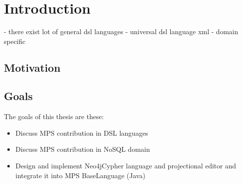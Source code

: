 \chapter{Introduction}

- there exist lot of general dsl languages
- universal dsl language xml
- domain specific

\section{Motivation}




\section{Goals}


The goals of this thesis are these:

\begin{itemize}
  \item Discuss MPS contribution in DSL languages
  \item Discuss MPS contribution in NoSQL domain
  \item Design and implement Neo4jCypher language and 
  		projectional editor and integrate it into MPS BaseLanguage (Java)
\end{itemize}